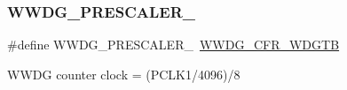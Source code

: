 \subsubsection{\texorpdfstring{W\+W\+D\+G\+\_\+\+P\+R\+E\+S\+C\+A\+L\+E\+R\+\_}{WWDG\_PRESCALER\_8}}
{\footnotesize\ttfamily \#define W\+W\+D\+G\+\_\+\+P\+R\+E\+S\+C\+A\+L\+E\+R\+\_~\hyperlink{group___peripheral___registers___bits___definition_ga067b1d8238f1d5613481aba71a946638}{W\+W\+D\+G\+\_\+\+C\+F\+R\+\_\+\+W\+D\+G\+TB}}

W\+W\+DG counter clock = (P\+C\+L\+K1/4096)/8 